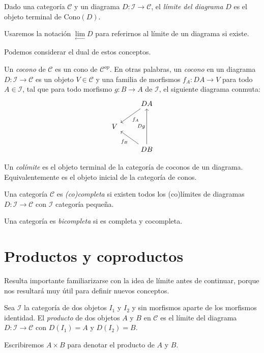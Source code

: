 \documentclass[12pt, twoside]{book}
\newcommand{\cat}{{\mathcal{C}}}
\begin{document}
\begin{definition}
Dado una categoría $\cat$ y un diagrama $D \colon \mathcal{I} \to \cat$, el \emph{límite del diagrama} $D$ es el objeto terminal de $\text{Cono}(D)$.
\end{definition}

Usaremos la notación $\underset{\longleftarrow}\lim D$ para referirnos al límite de un diagrama si existe.

Podemos considerar el dual de estos conceptos.

\begin{definition}
Un \emph{cocono} de $\cat$ es un cono de $\cat^{op}$.
En otras palabras, un \emph{cocono} en un diagrama $D \colon \mathcal{I} \to \cat$ es un objeto $V \in \cat$ y una familia de morfismos $f_A \colon D A \to V$ para todo $A \in \mathcal{I}$, tal que para todo morfismo $g \colon B \to A$ de $\mathcal{I}$, el siguiente diagrama conmuta:
\[ \begin{tikzcd}
 & D A \arrow[dl,"f_A"]\\
V\\
 & D B \arrow[ul,"f_B"] \arrow[uu,"D g"]
\end{tikzcd} \]
\end{definition}

\begin{definition}
Un \emph{colímite} es el objeto terminal de la categoría de coconos de un diagrama. Equivalentemente es el objeto inicial de la categoría de conos.
\end{definition}

\begin{definition}
Una categoría $\cat$ es \emph{(co)completa} si existen todos los (co)límites de diagramas $D \colon \mathcal{I} \to \cat$ con $\mathcal{I}$ categoría pequeña.
\end{definition}

\begin{definition}
Una categoría es \emph{bicompleta} si es completa y cocompleta.
\end{definition}

\section{Productos y coproductos}

Resulta importante familiarizarse con la idea de límite antes de continuar, porque nos resultará muy útil para definir nuevos conceptos.

\begin{definition}
Sea $\mathcal{I}$ la categoría de dos objetos $I_1$ y $I_2$ y sin morfismos aparte de los morfismos identidad. El \emph{producto} de dos objetos $A$ y $B$ en $\cat$ es el límite del diagrama $D \colon \mathcal{I} \to \cat$ con $D(I_1) = A$ y $D(I_2) = B$.

Escribiremos $A \times B$ para denotar el producto de $A$ y $B$.
\end{definition}
\end{document}

